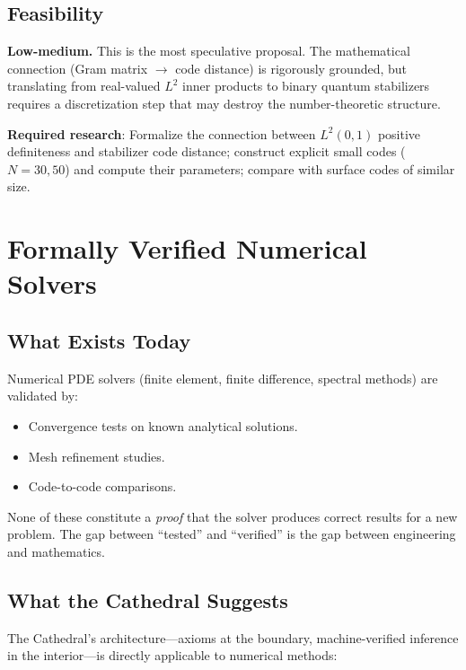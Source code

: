 \documentclass[11pt,a4paper]{article}
\begin{document}
\subsection{Feasibility}

\textbf{Low-medium.} This is the most speculative proposal. The
mathematical connection (Gram matrix $\to$ code distance) is
rigorously grounded, but translating from real-valued $L^2$
inner products to binary quantum stabilizers requires a
discretization step that may destroy the number-theoretic structure.

\textbf{Required research}: Formalize the connection between
$L^2(0,1)$ positive definiteness and stabilizer code distance;
construct explicit small codes ($N = 30, 50$) and compute their
parameters; compare with surface codes of similar size.

\section{Formally Verified Numerical Solvers}
\label{sec:verified}

\subsection{What Exists Today}

Numerical PDE solvers (finite element, finite difference, spectral
methods) are validated by:
\begin{itemize}
  \item Convergence tests on known analytical solutions.
  \item Mesh refinement studies.
  \item Code-to-code comparisons.
\end{itemize}

None of these constitute a \emph{proof} that the solver produces
correct results for a new problem. The gap between ``tested'' and
``verified'' is the gap between engineering and mathematics.

\subsection{What the Cathedral Suggests}

The Cathedral's architecture---axioms at the boundary, machine-verified
inference in the interior---is directly applicable to numerical
methods:
\end{document}
